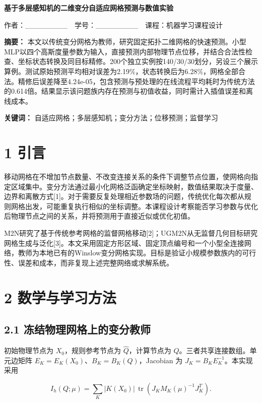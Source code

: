\documentclass[UTF8,a4paper,zihao=5,fontset=fandol]{ctexart}
\begin{document}
\begin{center}{\LARGE\bfseries 基于多层感知机的二维变分自适应网格预测与数值实验}\end{center}

作者：\_\_\_\_\_\_\_\_　学号：\_\_\_\_\_\_\_\_　课程：机器学习课程设计


\textbf{摘要：} 本文以传统变分网格为教师，研究固定拓扑二维网格的快速预测。小型MLP以四个高斯度量参数为输入，直接预测内部物理节点位移，并结合合法性检查、坐标状态转换及同目标精修。200个独立实例按140/30/30划分，另设三个展示算例。测试原始预测平均相对误差为2.19\%，状态转换后为6.28\%，网格全部合法。精修后误差降至4.24e-05，包含预测与预处理的在线流程平均耗时为传统方法的0.614倍。结果显示该问题族内存在预测与初值收益，同时需计入插值误差和离线成本。


\textbf{关键词：} 自适应网格；多层感知机；变分方法；位移预测；监督学习


\section*{1 引言}

移动网格在不增加节点数量、不改变连接关系的条件下调整节点位置，使网格向指定区域集中。变分方法通过最小化网格泛函确定坐标映射，数值结果取决于度量、边界和离散方式[1]。对于需要反复处理相近参数场的问题，传统优化每次都从规则网格出发，可能重复执行相似的坐标调整。本课程设计考察能否学习参数与优化后物理节点之间的关系，并将预测用于直接近似或优化初值。


M2N研究了基于传统参考网格的监督网格移动[2]；UGM2N从无监督几何目标研究网格生成与泛化[3]。本文采用固定方形区域、固定顶点编号和一个小型全连接网络，教师为本地已有的Winslow变分网格实现。目标是验证小规模参数族内的可行性、误差和成本，而非复现上述完整网络或求解系统。


\section*{2 数学与学习方法}

\subsection*{2.1 冻结物理网格上的变分教师}

初始物理节点为 $X_0$，规则参考节点为 $\widehat Q$，计算节点为 $Q$。三者共享连接数组。单元边矩阵 $E_K=E_K(X_0)$、$B_K=B_K(Q)$，Jacobian 为 $J_K=B_KE_K^{-1}$。本实现采用


\[
I_h(Q;\mu)=\sum_K |K(X_0)|\,\operatorname{tr}(J_K M_K(\mu)^{-1}J_K^T).
\]
\end{document}
